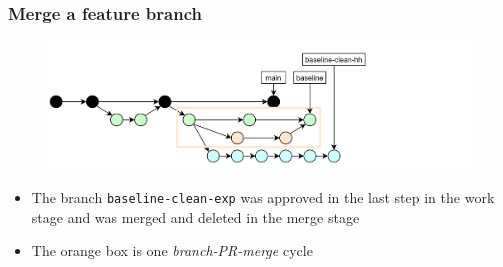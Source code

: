 \documentclass[aspectratio=169]{beamer} %
\begin{document}
\begin{frame}
	\frametitle{Merge a feature branch}

	\vspace{-.5cm}
	\begin{minipage}[t][5cm][t]{\textwidth}
		\begin{figure}
			\centering
			\includegraphics[width=\textwidth]{./img/dime-gitflow-network-2-4.png}
		\end{figure}
	\end{minipage}

	\vspace{-.5cm}
	\begin{minipage}[t][5cm][t]{\textwidth}
		\begin{itemize}
			\setlength\itemsep{.5em}
			\item The branch \texttt{baseline-clean-exp} was
			approved in the last step in the work stage and
			was merged and deleted in the merge stage
			\item The orange box is one \textit{branch-PR-merge} cycle
		\end{itemize}
	\end{minipage}
\end{frame}
\end{document}
